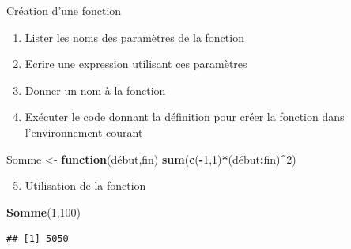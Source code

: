 \documentclass[
  ignorenonframetext,
]{beamer}
\newenvironment{Shaded}{\begin{snugshade}}{\end{snugshade}}
\newcommand{\ControlFlowTok}[1]{\textcolor[rgb]{0.13,0.29,0.53}{\textbf{#1}}}
\newcommand{\DecValTok}[1]{\textcolor[rgb]{0.00,0.00,0.81}{#1}}
\newcommand{\FunctionTok}[1]{\textcolor[rgb]{0.13,0.29,0.53}{\textbf{#1}}}
\newcommand{\NormalTok}[1]{#1}
\newcommand{\OtherTok}[1]{\textcolor[rgb]{0.56,0.35,0.01}{#1}}
\newcommand{\SpecialCharTok}[1]{\textcolor[rgb]{0.81,0.36,0.00}{\textbf{#1}}}
\providecommand{\tightlist}{%
  \setlength{\itemsep}{0pt}\setlength{\parskip}{0pt}}
\begin{document}
\begin{frame}[fragile]{Création d'une fonction}
\protect\hypertarget{cruxe9ation-dune-fonction}{}
\begin{enumerate}
\tightlist
\item
  Lister les noms des paramètres de la fonction
\item
  Ecrire une expression utilisant ces paramètres
\item
  Donner un nom à la fonction
\item
  Exécuter le code donnant la définition pour créer la fonction dans
  l'environnement courant
\end{enumerate}

\tiny

\begin{Shaded}
\begin{Highlighting}[]
\NormalTok{Somme }\OtherTok{\textless{}{-}} \ControlFlowTok{function}\NormalTok{(début,fin)}
  \FunctionTok{sum}\NormalTok{(}\FunctionTok{c}\NormalTok{(}\SpecialCharTok{{-}}\DecValTok{1}\NormalTok{,}\DecValTok{1}\NormalTok{)}\SpecialCharTok{*}\NormalTok{(début}\SpecialCharTok{:}\NormalTok{fin)}\SpecialCharTok{\^{}}\DecValTok{2}\NormalTok{)}
\end{Highlighting}
\end{Shaded}

\normalsize

\begin{enumerate}
\setcounter{enumi}{4}
\tightlist
\item
  Utilisation de la fonction
\end{enumerate}

\tiny

\begin{Shaded}
\begin{Highlighting}[]
\FunctionTok{Somme}\NormalTok{(}\DecValTok{1}\NormalTok{,}\DecValTok{100}\NormalTok{)}
\end{Highlighting}
\end{Shaded}

\begin{verbatim}
## [1] 5050
\end{verbatim}

\normalsize
\end{frame}
\end{document}
